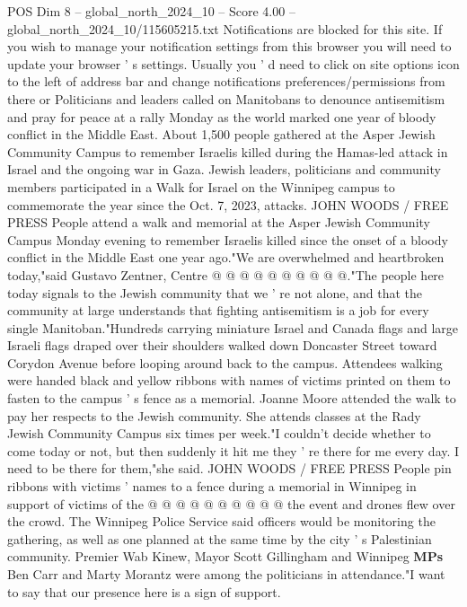 \begin{textsample}{POS Dim 8 – global\_north\_2024\_10 – Score 4.00 – global\_north\_2024\_10/115605215.txt}  \label{ex:f8_pos_250}
Notifications are blocked for this site.
If you wish to manage your notification settings from this browser you will need to update your browser ' s settings.
Usually you ' d need to click on site options icon to the left of address bar and change notifications preferences/permissions from there or Politicians and leaders called on Manitobans to denounce antisemitism and pray for peace at a rally Monday as the world marked one year of bloody conflict in the Middle East.
About 1,500 people gathered at the Asper Jewish Community Campus to remember Israelis killed during the Hamas-led attack in Israel and the ongoing war in Gaza.
Jewish leaders, politicians and community members participated in a Walk for Israel on the Winnipeg campus to commemorate the year since the Oct. 7, 2023, attacks.
JOHN WOODS / FREE PRESS People attend a walk and memorial at the Asper Jewish Community Campus Monday evening to remember Israelis killed since the onset of a bloody conflict in the Middle East one year ago."We are overwhelmed and heartbroken today,"said Gustavo Zentner, Centre @ @ @ @ @ @ @ @ @ @."The people here today signals to the Jewish community that we ' re not alone, and that the community at large understands that fighting antisemitism is a job for every single Manitoban."Hundreds carrying miniature Israel and Canada flags and large Israeli flags draped over their shoulders walked down Doncaster Street toward Corydon Avenue before looping around back to the campus.
Attendees walking were handed black and yellow ribbons with names of victims printed on them to fasten to the campus ' s fence as a memorial.
Joanne Moore attended the walk to pay her respects to the Jewish community.
She attends classes at the Rady Jewish Community Campus six times per week."I couldn't decide whether to come today or not, but then suddenly it hit me they ' re there for me every day.
I need to be there for them,"she said.
JOHN WOODS / FREE PRESS People pin ribbons with victims ' names to a fence during a memorial in Winnipeg in support of victims of the @ @ @ @ @ @ @ @ @ @ the event and drones flew over the crowd.
The Winnipeg Police Service said officers would be monitoring the gathering, as well as one planned at the same time by the city ' s Palestinian community.
Premier Wab Kinew, Mayor Scott Gillingham and Winnipeg \textbf{MPs} Ben Carr and Marty Morantz were among the politicians in attendance."I want to say that our presence here is a sign of support.

\end{textsample}
